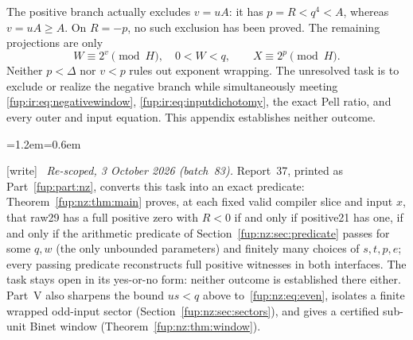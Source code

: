 \documentclass[11pt,letterpaper]{article}
\theoremstyle{definition}\newtheorem{definition}[theorem]{Definition}
\theoremstyle{remark}\newtheorem{remark}[theorem]{Remark}
\newcommand{\wtag}{\textup{[write]}}
\newenvironment{writenote}{\par\smallskip\begin{list}{}{\leftmargin=1.2em\rightmargin=0.6em}\item[]\small\wtag\ }{\end{list}\smallskip}
\begin{document}
The positive branch actually excludes $v=uA$: it has $p=R<q^4<A$, whereas $v=uA\ge A$. On $R=-p$, no such exclusion has been proved. The remaining projections are only
\[
 W\equiv2^v\pmod H,\quad0<W<q,\qquad X\equiv2^p\pmod H.
\]
Neither $p<\Delta$ nor $v<p$ rules out exponent wrapping. The unresolved task is to exclude or realize the negative branch while simultaneously meeting \eqref{fup:ir:eq:negativewindow}, \eqref{fup:ir:eq:inputdichotomy}, the exact Pell ratio, and every outer and input equation. This appendix establishes neither outcome.
\begin{writenote}
\emph{Re-scoped, 3 October 2026 (batch~83).} Report~37, printed as Part~\ref{fup:part:nz}, converts this task into an exact predicate: Theorem~\ref{fup:nz:thm:main} proves, at each fixed valid compiler slice and input $x$, that raw29 has a full positive zero with $R<0$ if and only if positive21 has one, if and only if the arithmetic predicate of Section~\ref{fup:nz:sec:predicate} passes for some $q,w$ (the only unbounded parameters) and finitely many choices of $s,t,p,e$; every passing predicate reconstructs full positive witnesses in both interfaces. The task stays open in its yes-or-no form: neither outcome is established there either. Part~V also sharpens the bound $us<q$ above to~\eqref{fup:nz:eq:even}, isolates a finite wrapped odd-input sector (Section~\ref{fup:nz:sec:sectors}), and gives a certified sub-unit Binet window (Theorem~\ref{fup:nz:thm:window}).
\end{writenote}
\end{document}
